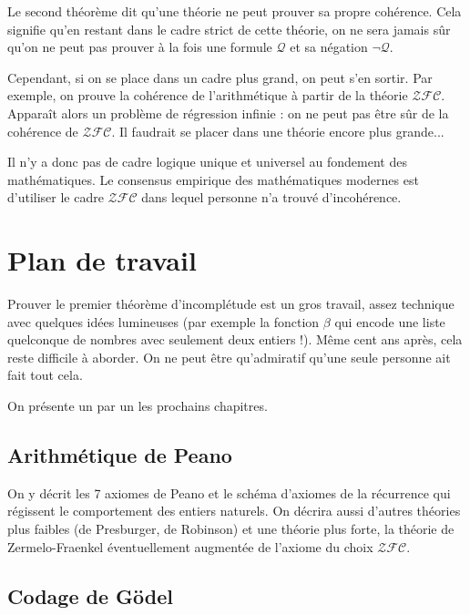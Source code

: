 \documentclass[11pt,class=report,crop=false]{standalone}
\begin{document}
Le second théorème dit qu'une théorie ne peut prouver sa propre cohérence. Cela signifie qu'en restant dans le cadre strict de cette théorie, on ne sera jamais sûr qu'on ne peut pas prouver à la fois une formule $\mathcal{Q}$ et sa négation $\lnot\mathcal{Q}$.

Cependant, si on se place dans un cadre plus grand, on peut s'en sortir.
Par exemple, on prouve la cohérence de l'arithmétique à partir de la théorie $\mathcal{ZFC}$. Apparaît alors un problème de régression infinie : on ne peut pas être sûr de la cohérence de $\mathcal{ZFC}$. Il faudrait se placer dans une théorie encore plus grande...

Il n'y a donc pas de cadre logique unique et universel au fondement des mathématiques.
Le consensus empirique des mathématiques modernes est d'utiliser le cadre $\mathcal{ZFC}$ dans lequel personne n'a trouvé d'incohérence.



\section{Plan de travail}

Prouver le premier théorème d'incomplétude est un gros travail, assez technique avec quelques idées lumineuses (par exemple la fonction $\beta$ qui encode une liste quelconque de nombres avec seulement deux entiers !). Même cent ans après, cela reste difficile à aborder. On ne peut être qu'admiratif qu'une seule personne ait fait tout cela.

On présente un par un les prochains chapitres.


\subsection{Arithmétique de Peano}

On y décrit les 7 axiomes de Peano et le schéma d'axiomes de la récurrence qui régissent le comportement des entiers naturels. On décrira aussi d'autres théories plus faibles (de Presburger, de Robinson) et une théorie plus forte, la théorie de Zermelo-Fraenkel éventuellement augmentée de l'axiome du choix $\mathcal{ZFC}$.


\subsection{Codage de Gödel}
\end{document}
